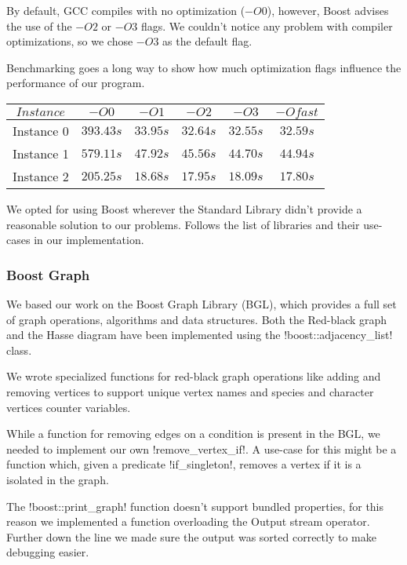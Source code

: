 
By default, GCC compiles with no optimization ($-O0$), however, Boost advises the use of the $-O2$ or $-O3$ flags. We couldn't notice any problem with compiler optimizations, so we chose $-O3$ as the default flag.

Benchmarking goes a long way to show how much optimization flags influence the performance of our program.

\begin{center}
  \begin{tabular}{c | c c c c c}
    $Instance$ & $-O0$     & $-O1$    & $-O2$    & $-O3$    & $-Ofast$ \\
    \hline
    Instance 0 & $393.43s$ & $33.95s$ & $32.64s$ & $32.55s$ & $32.59s$ \\
    Instance 1 & $579.11s$ & $47.92s$ & $45.56s$ & $44.70s$ & $44.94s$ \\
    Instance 2 & $205.25s$ & $18.68s$ & $17.95s$ & $18.09s$ & $17.80s$
  \end{tabular}
\end{center}

We opted for using Boost wherever the Standard Library didn't provide a reasonable solution to our problems.
Follows the list of libraries and their use-cases in our implementation.

\subsubsection*{Boost Graph}

We based our work on the Boost Graph Library (BGL), which provides a full set of graph operations, algorithms and data structures.
Both the Red-black graph and the Hasse diagram have been implemented using the !boost::adjacency_list! class.

We wrote specialized functions for red-black graph operations like adding and removing vertices to support unique vertex names and species and character vertices counter variables.

While a function for removing edges on a condition is present in the BGL, we needed to implement our own !remove_vertex_if!.
A  use-case for this might be a function which, given a predicate !if_singleton!, removes a vertex if it is a isolated in the graph.

The !boost::print_graph! function doesn't support bundled properties, for this reason we implemented a function overloading the Output stream operator.
Further down the line we made sure the output was sorted correctly to make debugging easier.

